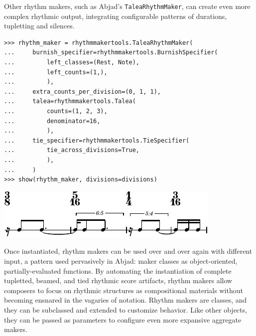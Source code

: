 \documentclass{article}
\begin{document}
\noindent Other rhythm makers, such as Abjad's \texttt{TaleaRhythmMaker}, can
create even more complex rhythmic output, integrating configurable patterns of
durations, tupletting and silences.

\begin{lstlisting}
>>> rhythm_maker = rhythmmakertools.TaleaRhythmMaker(
...     burnish_specifier=rhythmmakertools.BurnishSpecifier(
...         left_classes=(Rest, Note),
...         left_counts=(1,),
...         ),
...     extra_counts_per_division=(0, 1, 1),
...     talea=rhythmmakertools.Talea(
...         counts=(1, 2, 3),
...         denominator=16,
...         ),
...     tie_specifier=rhythmmakertools.TieSpecifier(
...         tie_across_divisions=True,
...         ),
...     )
>>> show(rhythm_maker, divisions=divisions)
\end{lstlisting}
\includegraphics{assets/lilypond-cf8687c5463d3d6aec12827476c8fc4e.pdf}

\noindent Once instantiated, rhythm makers can be used over and over again with
different input, a pattern used pervasively in Abjad: maker classes as
object-oriented, partially-evaluated functions. By automating the instantiation
of complete tupletted, beamed, and tied rhythmic score artifacts, rhythm makers
allow composers to focus on rhythmic structures as compositional materials
without becoming ensnared in the vagaries of notation. Rhythm makers are
classes, and they can be subclassed and extended to customize behavior. Like
other objects, they can be passed as parameters to configure even more
expansive aggregate makers.
\end{document}
